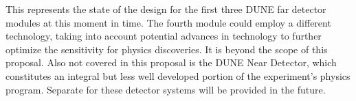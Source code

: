 This   represents the state of the design for the first three DUNE far detector modules at this moment
in time. The fourth module could employ a different \lartpc technology, taking into account  potential advances in technology to further optimize the sensitivity for physics discoveries. It is beyond the scope of this proposal. Also not covered in this proposal is the DUNE Near Detector, which constitutes an integral but less well developed portion of the experiment's  physics program. Separate   for these detector systems will be
provided in the future.


